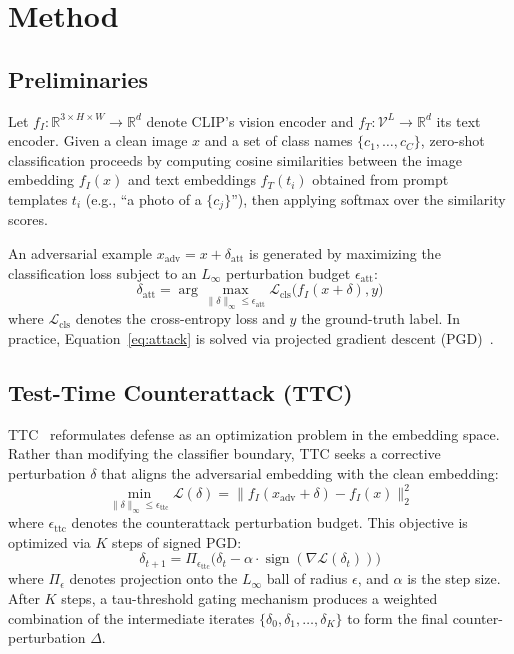 \documentclass[12pt,a4paper]{article}
\begin{document}
\section{Method}\label{sec:method}

\subsection{Preliminaries}

Let $f_I: \mathbb{R}^{3 \times H \times W} \to \mathbb{R}^d$ denote CLIP's vision encoder and $f_T: \mathcal{V}^L \to \mathbb{R}^d$ its text encoder. Given a clean image $x$ and a set of class names $\{c_1, \dots, c_C\}$, zero-shot classification proceeds by computing cosine similarities between the image embedding $f_I(x)$ and text embeddings $f_T(t_i)$ obtained from prompt templates $t_i$ (e.g., ``a photo of a $\{c_j\}$''), then applying softmax over the similarity scores.

An adversarial example $x_{\text{adv}} = x + \delta_{\text{att}}$ is generated by maximizing the classification loss subject to an $L_\infty$ perturbation budget $\epsilon_{\text{att}}$:
\begin{equation}
\delta_{\text{att}} = \arg\max_{\|\delta\|_\infty \leq \epsilon_{\text{att}}} \mathcal{L}_{\text{cls}}\big(f_I(x+\delta), y\big) \label{eq:attack}
\end{equation}
where $\mathcal{L}_{\text{cls}}$ denotes the cross-entropy loss and $y$ the ground-truth label. In practice, Equation~\ref{eq:attack} is solved via projected gradient descent (PGD)~\cite{madry2018towards}.

\subsection{Test-Time Counterattack (TTC)}

TTC~\cite{xing2025clip} reformulates defense as an optimization problem in the embedding space. Rather than modifying the classifier boundary, TTC seeks a corrective perturbation $\delta$ that aligns the adversarial embedding with the clean embedding:
\begin{equation}
\min_{\|\delta\|_\infty \leq \epsilon_{\text{ttc}}} \mathcal{L}(\delta) = \big\|f_I(x_{\text{adv}} + \delta) - f_I(x)\big\|^2_2 \label{eq:ttc_obj}
\end{equation}
where $\epsilon_{\text{ttc}}$ denotes the counterattack perturbation budget. This objective is optimized via $K$ steps of signed PGD:
\begin{equation}
\delta_{t+1} = \Pi_{\epsilon_{\text{ttc}}}\!\big(\delta_t - \alpha \cdot \operatorname{sign}(\nabla \mathcal{L}(\delta_t))\big) \label{eq:pgd_update}
\end{equation}
where $\Pi_{\epsilon}$ denotes projection onto the $L_\infty$ ball of radius $\epsilon$, and $\alpha$ is the step size. After $K$ steps, a tau-threshold gating mechanism produces a weighted combination of the intermediate iterates $\{\delta_0, \delta_1, \dots, \delta_K\}$ to form the final counter-perturbation $\Delta$.
\end{document}
